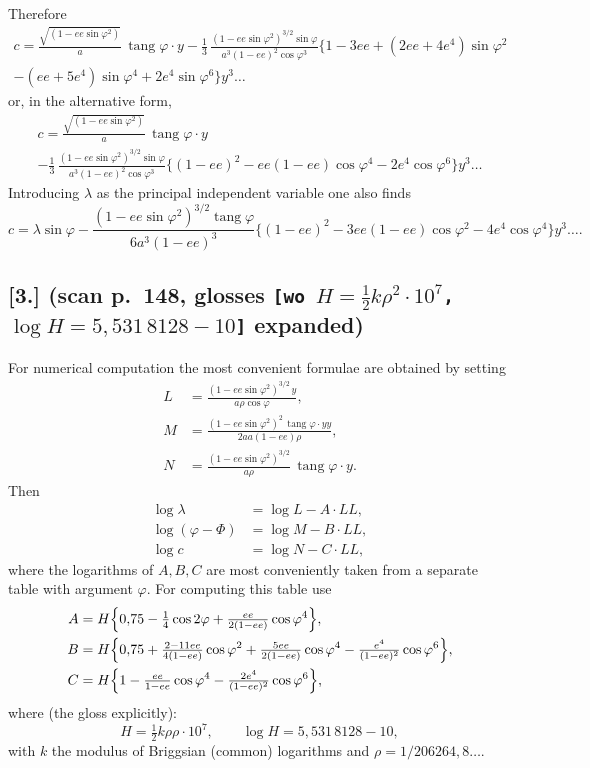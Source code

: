 \documentclass[12pt,a4paper]{article}
\newcommand{\tang}{\operatorname{tang}}
\begin{document}
Therefore
\begin{multline*}
   c = \frac{\sqrt{(1-ee\sin\varphi^{2})}}{a}\,\tang\varphi\cdot y
   - \tfrac{1}{3}\,\frac{(1-ee\sin\varphi^{2})^{3/2}\sin\varphi}{a^{3}(1-ee)^{2}\cos\varphi^{3}}
       \bigl\{1-3ee+(2ee+4e^{4})\sin\varphi^{2}\\
   -(ee+5e^{4})\sin\varphi^{4}+2e^{4}\sin\varphi^{6}\bigr\}y^{3}\ldots
\end{multline*}
or, in the alternative form,
\begin{multline*}
   c = \frac{\sqrt{(1-ee\sin\varphi^{2})}}{a}\,\tang\varphi\cdot y\\
   - \tfrac{1}{3}\,\frac{(1-ee\sin\varphi^{2})^{3/2}\sin\varphi}{a^{3}(1-ee)^{2}\cos\varphi^{3}}
       \bigl\{(1-ee)^{2}-ee(1-ee)\cos\varphi^{4}-2e^{4}\cos\varphi^{6}\bigr\}y^{3}\ldots
\end{multline*}
Introducing $\lambda$ as the principal independent variable one
also finds
\[
   c = \lambda\sin\varphi
     - \frac{(1-ee\sin\varphi^{2})^{3/2}\tang\varphi}{6a^{3}(1-ee)^{3}}
        \bigl\{(1-ee)^{2}-3ee(1-ee)\cos\varphi^{2}-4e^{4}\cos\varphi^{4}\bigr\}y^{3}\ldots.
\]

\bigskip

\subsection*{[3.] (scan p.~148, glosses \texttt{[wo $H=\tfrac12 k\rho^{2}\cdot10^{7}$, $\log H = 5{,}531\,8128-10$]} expanded)}

For numerical computation the most convenient formulae are obtained
by setting
\begin{align*}
   L &= \frac{(1-ee\sin\varphi^{2})^{3/2}\,y}{a\rho\cos\varphi},\\[2pt]
   M &= \frac{(1-ee\sin\varphi^{2})^{2}\,\tang\varphi\cdot yy}{2aa(1-ee)\rho},\\[2pt]
   N &= \frac{(1-ee\sin\varphi^{2})^{3/2}}{a\rho}\,\tang\varphi\cdot y.
\end{align*}
Then
\begin{align*}
   \log\lambda &= \log L - A\cdot LL,\\
   \log(\varphi-\Phi) &= \log M - B\cdot LL,\\
   \log c &= \log N - C\cdot LL,
\end{align*}
where the logarithms of $A,B,C$ are most conveniently taken from a
separate table with argument $\varphi$.
For computing this table use
\begin{align*}
   A &= H\Bigl\{0{,}75 - \tfrac{1}{4}\cos 2\varphi
           + \tfrac{ee}{2(1-ee)}\cos\varphi^{4}\Bigr\},\\
   B &= H\Bigl\{0{,}75
           + \tfrac{2-11ee}{4(1-ee)}\cos\varphi^{2}
           + \tfrac{5ee}{2(1-ee)}\cos\varphi^{4}
           - \tfrac{e^{4}}{(1-ee)^{2}}\cos\varphi^{6}\Bigr\},\\
   C &= H\Bigl\{1 - \tfrac{ee}{1-ee}\cos\varphi^{4}
           - \tfrac{2e^{4}}{(1-ee)^{2}}\cos\varphi^{6}\Bigr\},
\end{align*}
where (the gloss explicitly):
\[
   H = \tfrac{1}{2}k\rho\rho\cdot 10^{7},\qquad
   \log H = 5{,}531\,8128-10,
\]
with $k$ the modulus of Briggsian (common) logarithms and
$\rho = 1/206264{,}8\ldots$.
\end{document}
